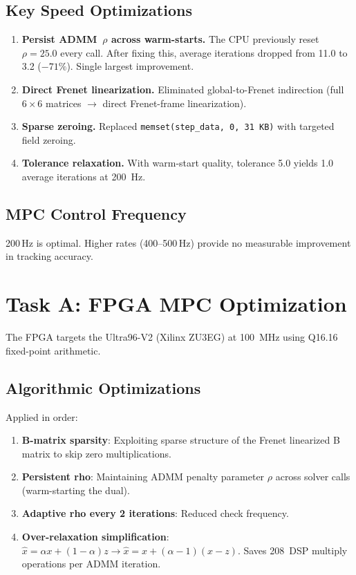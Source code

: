 \documentclass[11pt,a4paper]{article}
\begin{document}
\subsection{Key Speed Optimizations}
\begin{enumerate}
  \item \textbf{Persist ADMM~$\rho$ across warm-starts.} The CPU previously reset $\rho = 25.0$ every call. After fixing this, average iterations dropped from 11.0 to 3.2 ($-71\%$). Single largest improvement.
  \item \textbf{Direct Frenet linearization.} Eliminated global-to-Frenet indirection (full $6\times 6$ matrices $\to$ direct Frenet-frame linearization).
  \item \textbf{Sparse zeroing.} Replaced \texttt{memset(step\_data, 0, 31\,KB)} with targeted field zeroing.
  \item \textbf{Tolerance relaxation.} With warm-start quality, tolerance 5.0 yields 1.0 average iterations at \SI{200}{\hertz}.
\end{enumerate}

\subsection{MPC Control Frequency}
200\,Hz is optimal. Higher rates (400--500\,Hz) provide no measurable improvement in tracking accuracy.

\section{Task A: FPGA MPC Optimization}

The FPGA targets the Ultra96-V2 (Xilinx ZU3EG) at \SI{100}{\mega\hertz} using Q16.16 fixed-point arithmetic.

\subsection{Algorithmic Optimizations}
Applied in order:
\begin{enumerate}
  \item \textbf{B-matrix sparsity}: Exploiting sparse structure of the Frenet linearized B matrix to skip zero multiplications.
  \item \textbf{Persistent rho}: Maintaining ADMM penalty parameter $\rho$ across solver calls (warm-starting the dual).
  \item \textbf{Adaptive rho every 2 iterations}: Reduced check frequency.
  \item \textbf{Over-relaxation simplification}: $\hat{x} = \alpha x + (1-\alpha)z \to \hat{x} = x + (\alpha - 1)(x - z)$. Saves 208~DSP multiply operations per ADMM iteration.
\end{enumerate}
\end{document}
